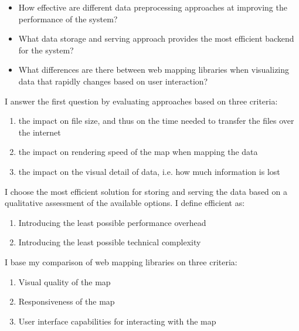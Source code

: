 \begin{itemize}
	\item How effective are different data preprocessing approaches at
	improving the performance of the system?
	\item What data storage and serving approach provides
	the most efficient backend for the system?
	\item What differences are there between web mapping libraries
	when visualizing data that rapidly changes based on user interaction?
\end{itemize}  %

I answer the first question by evaluating approaches based on three criteria:
\begin{enumerate}
	\item the impact on file size,
	and thus on the time needed to transfer the files over the internet
	\item the impact on rendering speed of the map when mapping the data
	\item the impact on the visual detail of data,
	i.e. how much information is lost
\end{enumerate}


I choose the most efficient solution for
storing and serving the data based on a qualitative assessment of
the available options. I define efficient as:
\begin{enumerate}
	\item Introducing the least possible performance overhead
	\item Introducing the least possible technical complexity
\end{enumerate}

I base my comparison of web mapping libraries on three criteria:
\begin{enumerate}
	\item Visual quality of the map
	\item Responsiveness of the map
	\item User interface capabilities for interacting with the map
\end{enumerate}

